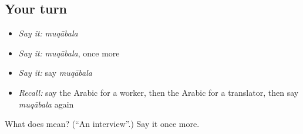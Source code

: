 \subsection*{Your turn}
\begin{itemize}
\raggedright
  \item \emph{Say it:} \emph{muqābala}
  \item \emph{Say it:} \emph{muqābala}, once more
  \item \emph{Say it:} say \emph{muqābala}
  \item \emph{Recall:} say the Arabic for a worker, then the Arabic for a translator, then say \emph{muqābala} again
\end{itemize}

\begin{tcolorbox}[breakable,colback=teal!4,colframe=teal!35!black,title={Before you move on}]
What does  mean? (\textquotedblleft{}An interview\textquotedblright{}.) Say it once more.
\end{tcolorbox}
